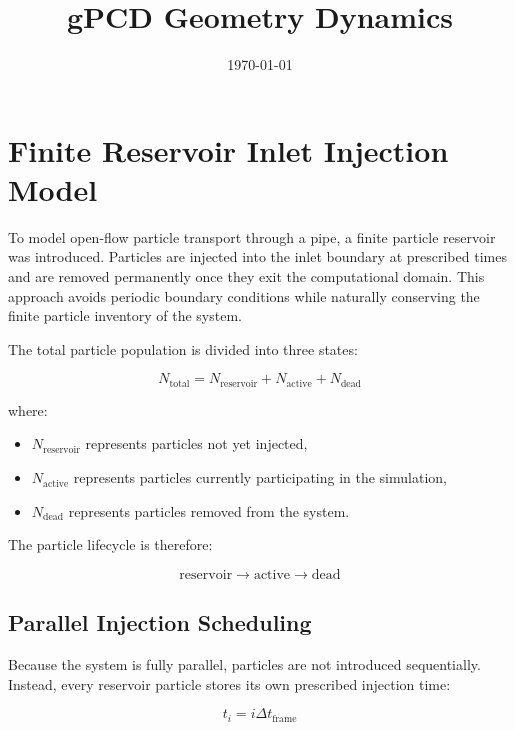 \documentclass[11pt]{article}
\title{gPCD Geometry Dynamics}
\author{}
\date{\today}
\begin{document}
\maketitle

\section{Finite Reservoir Inlet Injection Model}

To model open-flow particle transport through a pipe, a finite particle reservoir was introduced. Particles are injected into the inlet boundary at prescribed times and are removed permanently once they exit the computational domain. This approach avoids periodic boundary conditions while naturally conserving the finite particle inventory of the system.

The total particle population is divided into three states:

\begin{equation}
N_{\mathrm{total}}
=
N_{\mathrm{reservoir}}
+
N_{\mathrm{active}}
+
N_{\mathrm{dead}}
\end{equation}

where:

\begin{itemize}
\item $N_{\mathrm{reservoir}}$ represents particles not yet injected,
\item $N_{\mathrm{active}}$ represents particles currently participating in the simulation,
\item $N_{\mathrm{dead}}$ represents particles removed from the system.
\end{itemize}

The particle lifecycle is therefore:

\begin{equation}
\mathrm{reservoir}
\rightarrow
\mathrm{active}
\rightarrow
\mathrm{dead}
\end{equation}

\subsection{Parallel Injection Scheduling}

Because the system is fully parallel, particles are not introduced sequentially. Instead, every reservoir particle stores its own prescribed injection time:

\begin{equation}
t_i
=
i \Delta t_{\mathrm{frame}}
\end{equation}
\end{document}
